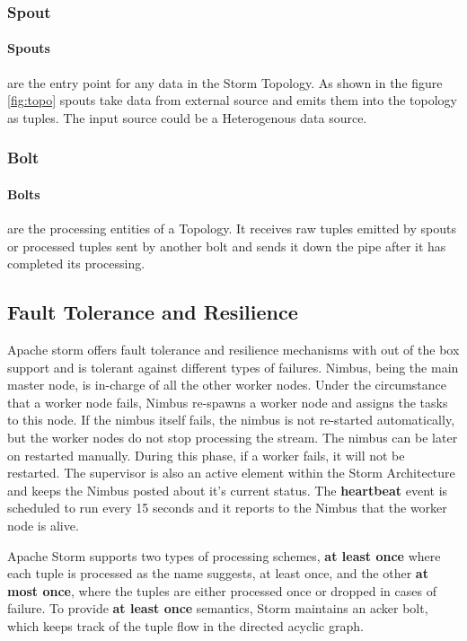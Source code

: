 \documentclass[runningheads,a4paper]{llncs}[2015/06/24]
\begin{document}
\subsubsection{Spout} 
\paragraph{Spouts} are the entry point for any data in the Storm Topology. As shown in the figure \ref{fig:topo} spouts take data from external source and emits them into the topology as tuples. The input source could be a Heterogenous data source.

\subsubsection{Bolt} 
\paragraph{Bolts} are the processing entities of a Topology. It receives raw tuples emitted by spouts or processed tuples sent by another bolt and sends it down the pipe after it has completed its processing.

\subsection{Fault Tolerance and Resilience}
\label{sec:resilience}
Apache storm offers fault tolerance and resilience mechanisms with out of the box support and is tolerant against different types of failures. Nimbus, being the main master node, is in-charge of all the other worker nodes. Under the circumstance that a worker node fails, Nimbus re-spawns a worker node and assigns the tasks to this node. If the nimbus itself fails, the nimbus is not re-started automatically, but the worker nodes do not stop processing the stream. The nimbus can be later on restarted manually. During this phase, if a worker fails, it will not be restarted. The supervisor is also an active element within the Storm Architecture and keeps the Nimbus posted about it's current status. The \textbf{heartbeat} event is scheduled to run every 15 seconds and it reports to the Nimbus that the worker node is alive. \cite{stormtwitter}

Apache Storm supports two types of processing schemes, \textbf{at least once} where each tuple is processed as the name suggests, at least once, and the other \textbf{at most once}, where the tuples are either processed once or dropped in cases of failure. To provide \textbf{at least once} semantics, Storm maintains an acker bolt, which keeps track of the tuple flow in the directed acyclic graph.
\end{document}
